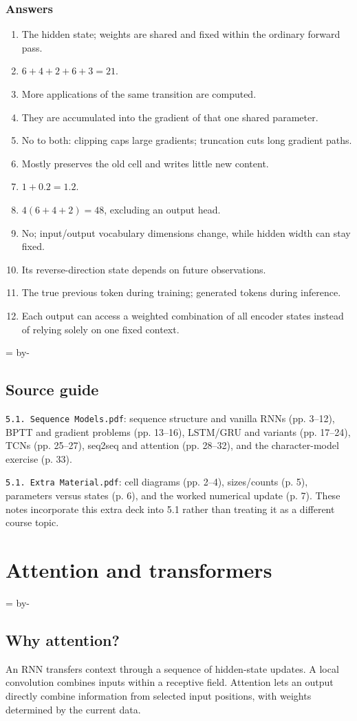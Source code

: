 \documentclass[11pt]{article}
\newcommand{\newsubsection}[1]{\par\begingroup\skip0=\pagegoal\advance\skip0 by-\pagetotal\ifdim\skip0<12\baselineskip\newpage\fi\endgroup\subsection{#1}}
\begin{document}
\subsubsection{Answers}
\begin{enumerate}
\item The hidden state; weights are shared and fixed within the ordinary forward pass.
\item $6+4+2+6+3=21$.
\item More applications of the same transition are computed.
\item They are accumulated into the gradient of that one shared parameter.
\item No to both: clipping caps large gradients; truncation cuts long gradient paths.
\item Mostly preserves the old cell and writes little new content.
\item $1+0.2=1.2$.
\item $4(6+4+2)=48$, excluding an output head.
\item No; input/output vocabulary dimensions change, while hidden width can stay fixed.
\item Its reverse-direction state depends on future observations.
\item The true previous token during training; generated tokens during inference.
\item Each output can access a weighted combination of all encoder states instead of relying solely on one fixed context.
\end{enumerate}

\newsubsection{Source guide}
\texttt{5.1. Sequence Models.pdf}: sequence structure and vanilla RNNs (pp. 3--12), BPTT and gradient problems (pp. 13--16), LSTM/GRU and variants (pp. 17--24), TCNs (pp. 25--27), seq2seq and attention (pp. 28--32), and the character-model exercise (p. 33).

\texttt{5.1. Extra Material.pdf}: cell diagrams (pp. 2--4), sizes/counts (p. 5), parameters versus states (p. 6), and the worked numerical update (p. 7). These notes incorporate this extra deck into 5.1 rather than treating it as a different course topic.


\clearpage
\section{Attention and transformers}

\newsubsection{Why attention?}
An RNN transfers context through a sequence of hidden-state updates. A local convolution combines inputs within a receptive field. Attention lets an output directly combine information from selected input positions, with weights determined by the current data.
\end{document}
